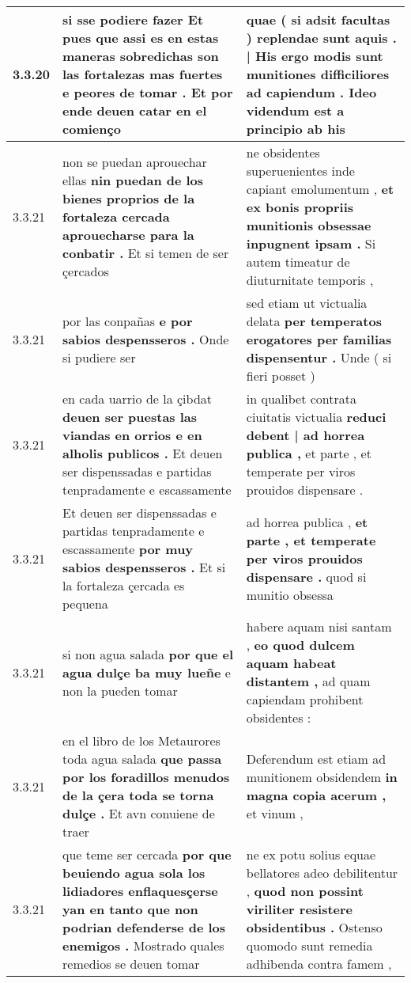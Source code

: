 \begin{tabular}{|p{1cm}|p{6.5cm}|p{6.5cm}|}
3.3.20 & si sse podiere fazer Et \textbf{ pues que assi es en estas maneras sobredichas son las fortalezas mas fuertes e peores de tomar . } Et por ende deuen catar en el comienço & quae ( si adsit facultas ) \textbf{ replendae sunt aquis . | His ergo modis sunt munitiones difficiliores ad capiendum . } Ideo videndum est a principio ab his \\\hline
3.3.21 & non se puedan aprouechar ellas \textbf{ nin puedan de los bienes proprios de la fortaleza cercada aprouecharse para la conbatir . } Et si temen de ser çercados & ne obsidentes superuenientes inde capiant emolumentum , \textbf{ et ex bonis propriis munitionis obsessae inpugnent ipsam . } Si autem timeatur de diuturnitate temporis , \\\hline
3.3.21 & por las conpañas \textbf{ e por sabios despensseros . } Onde si pudiere ser & sed etiam ut victualia delata \textbf{ per temperatos erogatores per familias dispensentur . } Unde ( si fieri posset ) \\\hline
3.3.21 & en cada uarrio de la çibdat \textbf{ deuen ser puestas las viandas en orrios e en alholis publicos . } Et deuen ser dispenssadas e partidas tenpradamente e escassamente & in qualibet contrata ciuitatis victualia \textbf{ reduci debent | ad horrea publica , } et parte , et temperate per viros prouidos dispensare . \\\hline
3.3.21 & Et deuen ser dispenssadas e partidas tenpradamente e escassamente \textbf{ por muy sabios despensseros . } Et si la fortaleza çercada es pequena & ad horrea publica , \textbf{ et parte , et temperate per viros prouidos dispensare . } quod si munitio obsessa \\\hline
3.3.21 & si non agua salada \textbf{ por que el agua dulçe ba muy lueñe } e non la pueden tomar & habere aquam nisi santam , \textbf{ eo quod dulcem aquam habeat distantem , } ad quam capiendam prohibent obsidentes : \\\hline
3.3.21 & en el libro de los 
                     Metaurores 
                   toda agua salada \textbf{ que passa por los foradillos menudos de la çera toda se torna dulçe . } Et avn conuiene de traer & Deferendum est etiam ad munitionem obsidendem \textbf{ in magna copia acerum , } et vinum , \\\hline
3.3.21 & que teme ser cercada \textbf{ por que beuiendo agua sola los lidiadores enflaquesçerse yan en tanto que non podrian defenderse de los enemigos . } Mostrado quales remedios se deuen tomar & ne ex potu solius equae bellatores adeo debilitentur , \textbf{ quod non possint viriliter resistere obsidentibus . } Ostenso quomodo sunt remedia adhibenda contra famem , \\\hline

\end{tabular}
